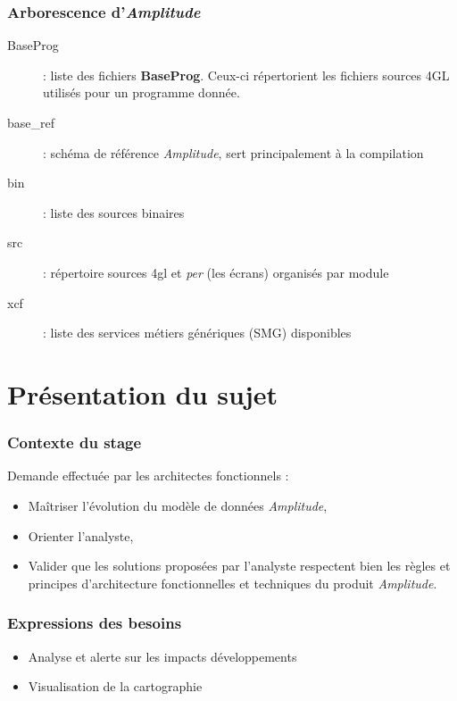 \documentclass{beamer}
\begin{document}
\begin{frame}
\frametitle{Arborescence d'\textit{Amplitude}}

\begin{description}
	\item[BaseProg] : liste des fichiers \textbf{BaseProg}. Ceux-ci répertorient les fichiers sources 4GL utilisés pour un programme donnée.
	\item[base\_ref] : schéma de référence \textit{Amplitude}, sert principalement à la compilation
	\item[bin] : liste des sources binaires
	\item[src] : répertoire sources 4gl et \textit{per} (les écrans) organisés par module
	\item[xcf] : liste des services métiers génériques (SMG) disponibles
\end{description}

\end{frame}

\section{Présentation du sujet}

\begin{frame}
\frametitle{Contexte du stage}

Demande effectuée par les architectes fonctionnels :

\begin{itemize}
	\item Maîtriser l’évolution du modèle de données \textit{Amplitude},
	\item Orienter l’analyste,
	\item Valider que les solutions proposées par l’analyste respectent bien les règles et principes d’architecture fonctionnelles et techniques du produit \textit{Amplitude}.
\end{itemize}

\end{frame}

\begin{frame}
\frametitle{Expressions des besoins}

\begin{itemize}
	\item Analyse et alerte sur les impacts développements
	\item Visualisation de la cartographie
\end{itemize}

\end{frame}
\end{document}
